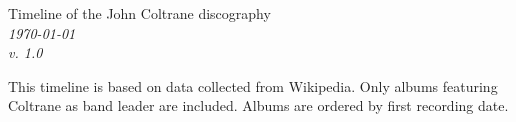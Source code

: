 \documentclass[a4paper, landscape]{article}
\newcounter{timelineend}
\newlength\legendx
\newcommand\makethelegend{
\small
    \node at (\legendx, 4.3) 
        [legend, anchor=north] (recorddatelegend) 
        {First recording date} ;

    \node at (\legendx, 4.5) 
        [legend, anchor=south, color=gray] 
        {Release year\\(if other than first rec.)};

    \node at (\legendx, 3.65) [legend] {*\,=\,live};

        \def\nodecolor{black}

    \node at (\legendx, 3.1) [] {Album};

    \node at (\legendx, 2.8) [inner sep=1.5pt, legend, anchor=north] (albumlegend) {Record label} ;

    \foreach \l/\c in 
        {Prestige/red,
        Blue~Note/blue,
        Savoy/violet,
        Atlantic/green,
        Pablo/black,
        Impulse!/orange}
        {
            \node at (albumlegend.south) 
                [inner sep=1.5pt, legend, rounded corners, draw=\c!40, fill=\c!10, anchor=north]
                (albumlegend) {\l\vphantom{jk}};
        }

        \node at (\legendx, -1.5) 
            []
            {Personnel};

        \node at (\legendx,-4)
            [legend]
            {Other\\recording\\dates};
}
\begin{document}
\thispagestyle{empty}

\begin{minipage}[t]{.4\textwidth}
{\huge Timeline of the John Coltrane discography}\\[\medskipamount]
\textit{\today\\v. 1.0}
\end{minipage}
\hfill
\begin{minipage}[t]{.38\textwidth}
\large
This timeline is based on data collected from Wikipedia. Only albums featuring Coltrane as band leader are included. Albums are ordered by first recording date.
\end{minipage}


\vfill

\center


\end{document}
